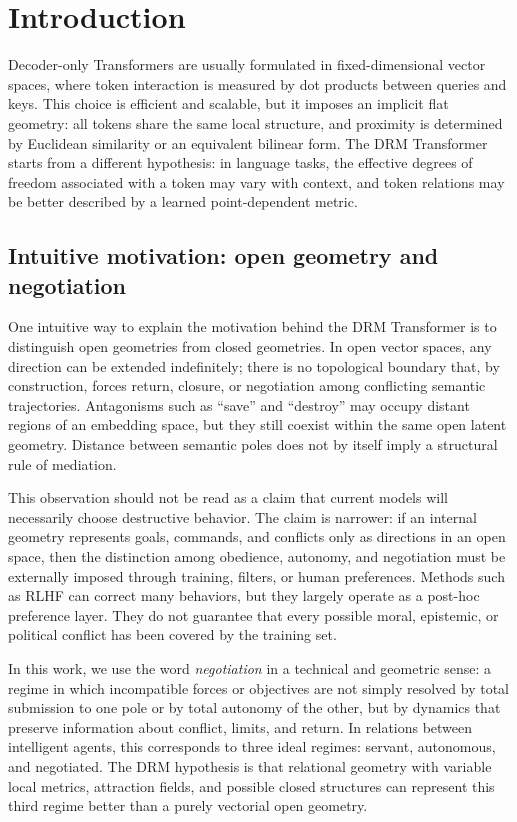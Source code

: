 \section{Introduction}

Decoder-only Transformers are usually formulated in fixed-dimensional vector
spaces, where token interaction is measured by dot products between queries and
keys. This choice is efficient and scalable, but it imposes an implicit flat
geometry: all tokens share the same local structure, and proximity is determined
by Euclidean similarity or an equivalent bilinear form. The DRM Transformer
starts from a different hypothesis: in language tasks, the effective degrees of
freedom associated with a token may vary with context, and token relations may
be better described by a learned point-dependent metric.

\subsection{Intuitive motivation: open geometry and negotiation}

One intuitive way to explain the motivation behind the DRM Transformer is to
distinguish open geometries from closed geometries. In open vector spaces, any
direction can be extended indefinitely; there is no topological boundary that,
by construction, forces return, closure, or negotiation among conflicting
semantic trajectories. Antagonisms such as ``save'' and ``destroy'' may occupy
distant regions of an embedding space, but they still coexist within the same
open latent geometry. Distance between semantic poles does not by itself imply
a structural rule of mediation.

This observation should not be read as a claim that current models will
necessarily choose destructive behavior. The claim is narrower: if an internal
geometry represents goals, commands, and conflicts only as directions in an open
space, then the distinction among obedience, autonomy, and negotiation must be
externally imposed through training, filters, or human preferences. Methods
such as RLHF can correct many behaviors, but they largely operate as a post-hoc
preference layer. They do not guarantee that every possible moral, epistemic,
or political conflict has been covered by the training set.

In this work, we use the word \emph{negotiation} in a technical and geometric
sense: a regime in which incompatible forces or objectives are not simply
resolved by total submission to one pole or by total autonomy of the other, but
by dynamics that preserve information about conflict, limits, and return. In
relations between intelligent agents, this corresponds to three ideal regimes:
servant, autonomous, and negotiated. The DRM hypothesis is that relational
geometry with variable local metrics, attraction fields, and possible closed
structures can represent this third regime better than a purely vectorial open
geometry.

